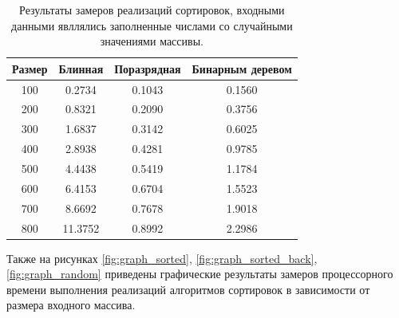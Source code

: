 \begin{table}[h]
	\begin{center}
		\begin{threeparttable}
		\captionsetup{justification=raggedleft,singlelinecheck=off}
		\caption{Результаты замеров реализаций сортировок, входными данными явллялись заполненные числами со случайными значениями массивы.}
		\label{tbl:random}
		\begin{tabular}{|c|c|c|c|}
			\hline
			 Размер & Блинная &  Поразрядная &  Бинарным деревом \\
			\hline
			100 & 0.2734 & 0.1043 & 0.1560 \\ 
			\hline
			200 & 0.8321 & 0.2090 & 0.3756 \\ 
			\hline
			300 & 1.6837 & 0.3142 & 0.6025 \\ 
			\hline
			400 & 2.8938 & 0.4281 & 0.9785 \\ 
			\hline
			500 & 4.4438 & 0.5419 & 1.1784 \\ 
			\hline
			600 & 6.4153 & 0.6704 & 1.5523 \\ 
			\hline
			700 & 8.6692 & 0.7678 & 1.9018 \\ 
			\hline
			800 & 11.3752 & 0.8992 & 2.2986 \\ 
			\hline
		\end{tabular}
		\end{threeparttable}
    \end{center}
\end{table}

\newpage

Также на рисунках \ref{fig:graph_sorted}, \ref{fig:graph_sorted_back}, \ref{fig:graph_random} приведены графические результаты замеров процессорного времени выполнения реализаций алгоритмов сортировок в зависимости от размера входного массива.


